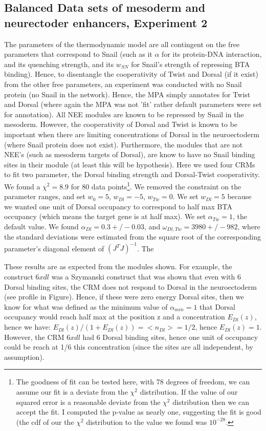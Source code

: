\subsection*{Balanced Data sets of mesoderm and neurectoder enhancers, Experiment 2}
The parameters of the thermodynamic model are all contingent on the free parameters that correspond to Snail (such as it $\alpha$ for its protein-DNA interaction, and its quenching strength, and its $w_{SN}$ for Snail's strength of repressing BTA binding).  Hence, to disentangle the cooperativity of Twist and Dorsal (if it exist) from the other free parameters, an experiment was conducted with no Snail protein (no Snail in the network).  Hence, the MPA simply annotates for Twist and Dorsal (where again the MPA was not 'fit' rather default parameters were set for annotation).  All NEE modules are known to be repressed by Snail in the mesoderm.  However, the cooperativity of Dorsal and Twist is known to be important when there are limiting concentrations of Dorsal in the neuroectoderm (where Snail protein does not exist).  Furthermore, the modules that are not NEE's (such as mesoderm targets of Dorsal), are know to have no Snail binding sites in their module (at least this will be hypothesis).  Here we used four CRMs to fit two parameter, the Dorsal binding strength and Dorsal-Twist cooperativity.  We found a $\chi^2=8.9$ for 80 data points\footnote{The goodness of fit can be tested here, with 78 degrees of freedom, we can assume our fit is a deviate from the $\chi^2$ distribution.  If the value of our squared error is a reasonable deviate from the $\chi^2$ distribution then we can accept the fit.  I computed the p-value as nearly one, suggesting the fit is good (the cdf of our the $\chi^2$ distribution to the value we found was $10^{-28}$. }.    We removed the constraint on the parameter ranges, and set $w_0= 5$,  $w_{Dl}=-5$, $w_{Tw}=0$.  We set $w_{Dl}=5$ because we wanted one unit of Dorsal occupancy to correspond to half max BTA occupancy (which means the target gene is at half max).  We set $\alpha_{Tw}=1$, the default value.  We found $\alpha_{Dl}=0.3 +/- 0.03$, and $\omega_{Dl,Tw}=3980 +/- 982$, where the standard deviations were estimated from the square root of the corresponding parameter's diagonal element of $(J^TJ)^{-1}$.  The   

These results are as expected from the modules shown.  For example, the construct $6xdl$ was a Szymanski construct that was shown that even with 6 Dorsal binding sites, the CRM does not respond to Dorsal in the neuroectoderm (see profile in Figure).  Hence, if these were zero energy Dorsal sites, then we know for what was defined as the minimum value of $\alpha_{min}=1$ that Dorsal occupancy would reach half max at the position z and a concentration $E_{Dl}(z)$, hence we have: $E_{Dl}(z)/(1+E_{Dl}(z))=<n_{Dl}>= 1/2$, hence $E_{Dl}(z)= 1$.  However, the CRM $6xdl$ had 6 Dorsal binding sites, hence one unit of occupancy could be reach at 1/6 this concentration (since the sites are all independent, by assumption).

